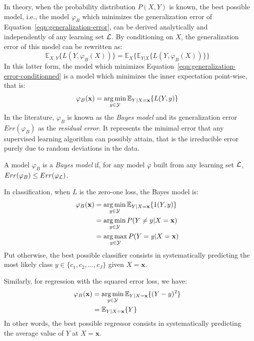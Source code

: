 In theory, when the probability distribution $P(X, Y)$ is known, the best possible model,
i.e., the model $\varphi_B$ which minimizes the generalization error of
Equation~\ref{eqn:generalization-error}, can be derived analytically and
independently of any learning set ${\cal L}$.
By conditioning on $X$, the generalization error of this model can be rewritten as:
\begin{equation}\label{eqn:generalization-error-conditionned}
\mathbb{E}_{X, Y}\{ L(Y, \varphi_B(X)) \} = \mathbb{E}_{X}\{ \mathbb{E}_{Y|X} \{ L(Y, \varphi_B(X)) \} \}
\end{equation}
In this latter form, the model which minimizes
Equation~\ref{eqn:generalization-error-conditionned} is a model which
minimizes the inner expectation point-wise, that is:
\begin{equation}
\varphi_B(\mathbf{x}) = \operatorname*{arg\,min}_{y \in {\cal Y}} \mathbb{E}_{Y|X=\mathbf{x}} \{ L(Y, y) \}
\end{equation}
In the literature, $\varphi_B$ is known as the \textit{Bayes model} and its
generalization error $Err(\varphi_B)$ as the \textit{residual error}. It represents the minimal
error that any supervised learning algorithm can possibly attain, that is
the irreducible error purely due to random deviations in the data.

\begin{definition}
A model $\varphi_B$\label{ntn:varphi-B} is a \emph{Bayes model} if, for any model $\varphi$ built from any
learning set ${\cal L}$, $Err(\varphi_B) \leq Err(\varphi_{\cal L})$.
\end{definition}

In classification, when $L$ is the zero-one loss, the Bayes model is:
\begin{align}
\varphi_B(\mathbf{x}) &= \operatorname*{arg\,min}_{y \in {\cal Y}} \mathbb{E}_{Y|X=\mathbf{x}} \{ 1(Y, y) \} \nonumber \\
                      &= \operatorname*{arg\,min}_{y \in {\cal Y}} P(Y \neq y|X=\mathbf{x}) \nonumber \\
                      &= \operatorname*{arg\,max}_{y \in {\cal Y}} P(Y = y|X=\mathbf{x}) \label{eqn:bayes-model-classification}
\end{align}
Put otherwise, the best possible classifier
consists in systematically predicting the most likely class $y \in \{c_1, c_2, ..., c_J\}$
given $X=\mathbf{x}$.

Similarly, for regression with the squared error loss, we have:
\begin{align}
\varphi_B(\mathbf{x}) &= \operatorname*{arg\,min}_{y \in {\cal Y}} \mathbb{E}_{Y|X=\mathbf{x}} \{ (Y - y)^2 \} \nonumber \\
                      &= \mathbb{E}_{Y|X=\mathbf{x}} \{ Y \} \label{eqn:bayes-model-regression}
\end{align}
In other words, the best possible regressor consists in systematically predicting
the average value of $Y$ at $X=\mathbf{x}$.


